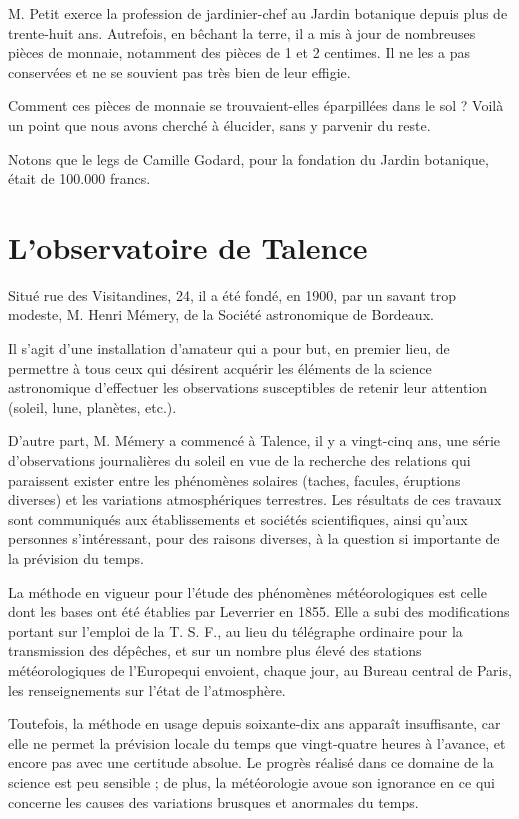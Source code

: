\documentclass[a4paper,11pt]{book}
\begin{document}
M. Petit exerce la profession de jardinier-chef au Jardin botanique depuis plus de trente-huit ans. Autrefois, en bêchant la terre, il a mis à jour de nombreuses pièces de monnaie, notamment des pièces de 1 et 2 centimes. Il ne les a pas conservées et ne se souvient pas très bien de leur effigie.

Comment ces pièces de monnaie se trouvaient-elles éparpillées dans le sol ? Voilà un point que nous avons cherché à élucider, sans y parvenir du reste.

Notons que le legs de Camille Godard, pour la fondation du Jardin botanique, était de 100.000 francs.

\section{L'observatoire de Talence}

Situé rue des Visitandines, 24, il a été fondé, en 1900, par un savant trop modeste, M. Henri Mémery, de la Société astronomique de Bordeaux.

Il s'agit d'une installation d'amateur qui a pour but, en premier lieu, de permettre à tous ceux qui désirent acquérir les éléments de la science astronomique d'effectuer les observations susceptibles de retenir leur attention (soleil, lune, planètes, etc.).

D'autre part, M. Mémery a commencé à Talence, il y a vingt-cinq ans, une série d'observations journalières du soleil en vue de la recherche des relations qui paraissent exister entre les phénomènes solaires (taches, facules, éruptions diverses) et les variations atmosphériques terrestres. Les résultats de ces travaux sont communiqués aux établissements et sociétés scientifiques, ainsi qu'aux
personnes s'intéressant, pour des raisons diverses, à la question si importante de la prévision du temps. 

La méthode en vigueur pour l'étude des phénomènes météorologiques est celle dont les bases ont été établies par Leverrier en 1855. Elle a subi des modifications portant sur l'emploi de la T. S. F., au lieu du télégraphe ordinaire pour la transmission des dépêches, et sur un nombre plus élevé des stations météorologiques de l'Europequi envoient, chaque jour, au Bureau central de Paris, les renseignements sur l'état de l'atmosphère.

Toutefois, la méthode en usage depuis soixante-dix ans apparaît insuffisante, car elle ne permet la prévision locale du temps que vingt-quatre heures à l'avance, et encore pas avec une certitude absolue. Le progrès réalisé dans ce domaine de la science est peu sensible ; de plus, la météorologie avoue son ignorance en ce qui concerne les causes des variations brusques et anormales du temps.
\end{document}
